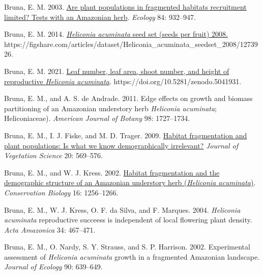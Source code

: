 \documentclass[
  man, donotrepeattitle,floatsintext]{apa6}
\newlength{\cslhangindent}
\newlength{\cslentryspacingunit} %
\newenvironment{CSLReferences}[2] %
 {%
  \setlength{\parindent}{0pt}
  \ifodd #1
  \let\oldpar\par
  \def\par{\hangindent=\cslhangindent\oldpar}
  \fi
  \setlength{\parskip}{#2\cslentryspacingunit}
 }%
 {}
\begin{document}
\begin{CSLReferences}{1}{0}
\leavevmode{}%
Bruna, E. M. 2003. \href{https://doi.org/10.1890/0012-9658(2003)084\%5B0932:APPIFH\%5D2.0.CO;2}{Are plant populations in fragmented habitats recruitment limited? {Tests} with an {Amazonian} herb}. \emph{Ecology} 84: 932--947.

\leavevmode{}%
Bruna, E. M. 2014. \href{https://doi.org/10.6084/m9.figshare.1273926.v2}{\emph{{Heliconia} acuminata} seed set (seeds per fruit) 2008.} https://figshare.com/articles/dataset/Heliconia\_acuminata\_seedset\_2008/1273926.

\leavevmode{}%
Bruna, E. M. 2021. \href{https://doi.org/10.5281/zenodo.5041931}{Leaf number, leaf area, shoot number, and height of reproductive \emph{{Heliconia} acuminata}}. https://doi.org/10.5281/zenodo.5041931.

\leavevmode{}%
Bruna, E. M., and A. S. de Andrade. 2011. Edge effects on growth and biomass partitioning of an {Amazonian} understory herb \emph{{Heliconia} acuminata}; {Heliconiaceae}). \emph{American Journal of Botany} 98: 1727--1734.

\leavevmode{}%
Bruna, E. M., I. J. Fiske, and M. D. Trager. 2009. \href{https://doi.org/10.1111/j.1654-1103.2009.01060.x}{Habitat fragmentation and plant populations: Is what we know demographically irrelevant?} \emph{Journal of Vegetation Science} 20: 569--576.

\leavevmode{}%
Bruna, E. M., and W. J. Kress. 2002. \href{https://doi.org/10.1046/j.1523-1739.2002.99494.x}{Habitat fragmentation and the demographic structure of an {Amazonian} understory herb (\emph{{Heliconia} acuminata})}. \emph{Conservation Biology} 16: 1256--1266.

\leavevmode{}%
Bruna, E. M., W. J. Kress, O. F. da Silva, and F. Marques. 2004. \emph{{Heliconia} acuminata} reproductive succeess is independent of local flowering plant density. \emph{Acta Amazonica} 34: 467--471.

\leavevmode{}%
Bruna, E. M., O. Nardy, S. Y. Strauss, and S. P. Harrison. 2002. Experimental assessment of \emph{{Heliconia} acuminata} growth in a fragmented {Amazonian} landscape. \emph{Journal of Ecology} 90: 639--649.


\end{CSLReferences}
\end{document}
